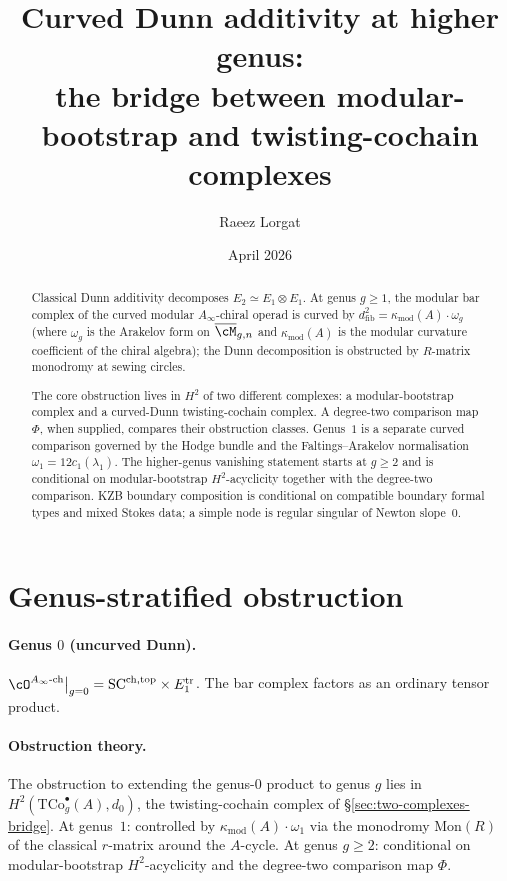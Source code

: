 \documentclass[11pt]{amsart}
\title{Curved Dunn additivity at higher genus:\\
the bridge between modular-bootstrap and twisting-cochain complexes}
\author{Raeez Lorgat}
\date{April 2026}
\theoremstyle{definition}
\theoremstyle{remark}
\providecommand{\Ainf}{A_\infty}
\begin{document}
\maketitle

\begin{abstract}
Classical Dunn additivity decomposes $E_2 \simeq E_1 \otimes E_1$. At
genus $g \ge 1$, the modular bar complex of the curved modular
$\Ainf$-chiral operad is curved by
$d^2_{\mathrm{fib}} = \kappa_{\mathrm{mod}}(A) \cdot \omega_g$ (where
$\omega_g$ is the Arakelov form on $\overline{\cM}_{g,n}$ and
$\kappa_{\mathrm{mod}}(A)$ is the modular curvature coefficient of
the chiral algebra); the Dunn decomposition is obstructed
by $R$-matrix monodromy at sewing circles.

The core obstruction lives in $H^2$ of two different complexes:
a modular-bootstrap complex and a curved-Dunn twisting-cochain
complex. A degree-two comparison map $\Phi$, when supplied, compares
their obstruction classes. Genus~$1$ is a separate curved comparison
governed by the Hodge bundle and the Faltings--Arakelov normalisation
$\omega_1=12c_1(\lambda_1)$.  The higher-genus vanishing statement
starts at $g\ge2$ and is conditional on modular-bootstrap
$H^2$-acyclicity together with the degree-two comparison.  KZB
boundary composition is conditional on compatible boundary formal
types and mixed Stokes data; a simple node is regular singular of
Newton slope~$0$.
\end{abstract}

\section{Genus-stratified obstruction}
\label{sec:three-levels-cd}

\paragraph{Genus $0$ (uncurved Dunn).}
$\cO^{\Ainf\text{-ch}}\big|_{g=0} = \mathrm{SC}^{\mathrm{ch,top}}
\times E_1^{\mathrm{tr}}$. The bar complex factors as an ordinary
tensor product.

\paragraph{Obstruction theory.}
The obstruction to extending the genus-$0$ product to genus $g$
lies in $H^2(\mathrm{TCo}^\bullet_g(A), d_0)$, the twisting-cochain
complex of \S\ref{sec:two-complexes-bridge}. At genus~$1$: controlled
by $\kappa_{\mathrm{mod}}(A) \cdot \omega_1$ via the monodromy
$\mathrm{Mon}(R)$ of the classical $r$-matrix around the $A$-cycle.
At genus $g \ge 2$: conditional on modular-bootstrap $H^2$-acyclicity
and the degree-two comparison map $\Phi$.
\end{document}
